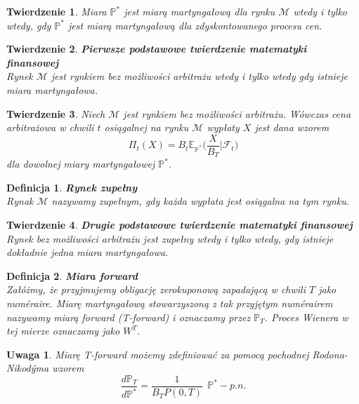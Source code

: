\documentclass{mini}
\theoremstyle{mythstyle}
\newtheorem{Twierdzenie}{Twierdzenie}[chapter]
\newtheorem{Definicja}{Definicja}[chapter]
\newtheorem{Uwaga}{Uwaga}[chapter]
\begin{document}
\begin{Twierdzenie}
	Miara $\mathbb{P}^*$ jest miarą martyngałową dla rynku $\mathcal{M}$ wtedy i tylko wtedy, gdy $\mathbb{P}^*$ jest miarą martyngałową dla zdyskontowanego procesu cen.\\
\end{Twierdzenie}
\begin{Twierdzenie}
	\textbf{Pierwsze podstawowe twierdzenie matematyki finansowej}\\
	Rynek $\mathcal{M}$ jest rynkiem bez możliwości arbitrażu wtedy i tylko wtedy gdy istnieje miara martyngałowa.\\
\end{Twierdzenie}
\begin{Twierdzenie}
	Niech $\mathcal{M}$ jest rynkiem bez możliwości arbitrażu. Wówczas cena arbitrażowa w chwili $t$ osiągalnej na rynku $\mathcal{M}$ wypłaty $X$ jest dana wzorem
	\begin{equation*}
	\Pi_{t}(X) = B_t \mathbb{E}_{\mathbb{P}^*}  \bigg( \frac{X}{B_T}\bigg|\mathcal{ F}_t\bigg)
	\end{equation*}
	dla dowolnej miary martyngałowej $\mathbb{P}^*$.\\
\end{Twierdzenie}
\begin{Definicja} \textbf{Rynek zupełny}\\
	Rynak $\mathcal{M}$ nazywamy zupełnym, gdy każda wypłata jest osiągalna na tym rynku.\\
\end{Definicja}
\begin{Twierdzenie}
	\textbf{Drugie podstawowe twierdzenie matematyki finansowej}\\
	Rynek bez możliwości arbitrażu jest zupełny wtedy i tylko wtedy, gdy istnieje dokładnie jedna miara martyngałowa.\\
\end{Twierdzenie}
\begin{Definicja}
	\textbf{Miara forward}\\
	Załóżmy, że przyjmujemy obligację zerokuponową zapadającą w chwili $T$ jako num\'{e}raire. Miarę martyngałową stowarzyszoną z tak przyjętym num\'{e}rairem nazywamy miarą forward (T-forward) i oznaczamy przez $\mathbb{P}_T$. Proces Wienera w tej mierze oznaczamy jako $W^T$.\\
\end{Definicja}
\begin{Uwaga}
	Miarę T-forward możemy zdefiniować za pomocą pochodnej Rodona-Nikod\'{y}ma wzorem
	\begin{equation*}
	\frac{d\mathbb{P}_T}{d\mathbb{P^*}} = \frac{1}{B_T P(0,T)} \   \ \mathbb{P^*}-p.n.
	\end{equation*}
\end{Uwaga}
\end{document}
